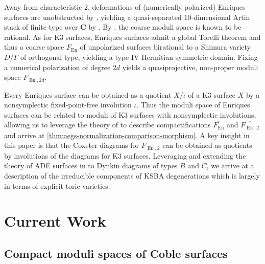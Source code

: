 \documentclass{amsart}
\begin{document}
Away from characteristic 2, deformations of (numerically polarized) Enriques surfaces are unobstructed by \cite{Il79,La83}, yielding a quasi-separated 10-dimensional Artin stack of finite type over \({\mathbf{C}}\) by \cite[Thm.\, 5.11.6]{EnriquesOne}. By \cite{kondo1994the-rationality}, the coarse moduli space is known to be rational. As for K3 surfaces, Enriques surfaces admit a global Torelli theorem and thus a coarse space \(F_{\operatorname{En}}\) of unpolarized surfaces birational to a Shimura variety \(D/\Gamma\) of orthogonal type, yielding a type IV Hermitian symmetric domain. Fixing a numerical polarization of degree \(2d\) yields a quasiprojective, non-proper moduli space \(F_{\operatorname{En}, 2d}\).

Every Enriques surface can be obtained as a quotient \(X/\iota\) of a K3 surface \(X\) by a nonsymplectic fixed-point-free involution \(\iota\). Thus the moduli space of Enriques surfaces can be related to moduli of K3 surfaces with nonsymplectic involutions, allowing us to leverage the theory of \cite{AE22} to describe compactifications \(\overline{F_{\operatorname{En}}}\) and \(\overline{F_{\operatorname{En}, 2}}\) and arrive at \cref{thm:aegs-normalization-comparison-morphism}. A key insight in this paper is that the Coxeter diagrams for \(F_{\operatorname{En}, 2}\) can be obtained as quotients by involutions of the diagrams for K3 surfaces. Leveraging and extending the theory of ADE surfaces in \cite{AT21} to Dynkin diagrams of types \(B\) and \(C\), we arrive at a description of the irreducible components of KSBA degenerations which is largely in terms of explicit toric varieties.

\section{Current Work}\label{current-work}

\subsection{Compact moduli spaces of Coble surfaces}\label{compact-moduli-spaces-of-coble-surfaces}
\end{document}
